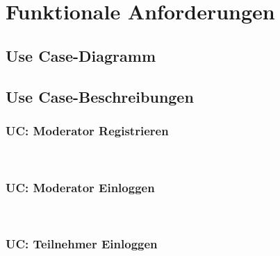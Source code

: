 \section{Funktionale Anforderungen}

\subsection{Use Case-Diagramm}

\pagebreak

\subsection{Use Case-Beschreibungen}

\subsubsection{UC: Moderator Registrieren}

\\[0.5cm]
\pagebreak

\subsubsection{UC: Moderator Einloggen}

\\[0.5cm]
\pagebreak

\subsubsection{UC: Teilnehmer Einloggen}

\\[0.5cm]
\pagebreak

